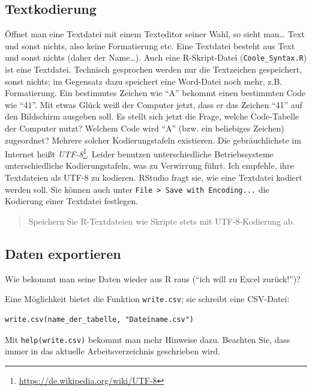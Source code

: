 \documentclass[12pt,ngerman,]{book}
\let\rmarkdownfootnote\footnote%
\def\footnote{\protect\rmarkdownfootnote}
\begin{document}
\subsection{Textkodierung}\label{textkodierung}

Öffnet man eine Textdatei mit einem Texteditor seiner Wahl, so sieht
man\ldots{} Text und sonst nichts, also keine Formatierung etc. Eine
Textdatei besteht aus Text und sonst nichts (daher der Name\ldots{}).
Auch eine R-Skript-Datei (\texttt{Coole\_Syntax.R}) ist eine Textdatei.
Technisch gesprochen werden nur die Textzeichen gespeichert, sonst
nichts; im Gegensatz dazu speichert eine Word-Datei noch mehr, z.B.
Formatierung. Ein bestimmtes Zeichen wie ``A'' bekommt einen bestimmten
Code wie ``41''. Mit etwas Glück weiß der Computer jetzt, dass er das
Zeichen ``41'' auf den Bildschirm ausgeben soll. Es stellt sich jetzt
die Frage, welche Code-Tabelle der Computer nutzt? Welchem Code wird
``A'' (bzw. ein beliebiges Zeichen) zugeordnet? Mehrere solcher
Kodierungstafeln existieren. Die gebräuchlichste im Internet heißt
\emph{UTF-8}\footnote{\url{https://de.wikipedia.org/wiki/UTF-8}}. Leider
benutzen unterschiedliche Betriebssysteme unterschiedliche
Kodierungstafeln, was zu Verwirrung führt. Ich empfehle, ihre
Textdateien als UTF-8 zu kodieren. RStudio fragt sie, wie eine Textdatei
kodiert werden soll. Sie können auch unter
\texttt{File\ \textgreater{}\ Save\ with\ Encoding...} die Kodierung
einer Textdatei festlegen.

\begin{quote}
Speichern Sie R-Textdateien wie Skripte stets mit UTF-8-Kodierung ab.
\end{quote}

\subsection{Daten exportieren}\label{daten-exportieren}

Wie bekommt man seine Daten wieder aus R raus (``ich will zu Excel
zurück!'')?

Eine Möglichkeit bietet die Funktion \texttt{write.csv}; sie schreibt
eine CSV-Datei:

\begin{verbatim}
write.csv(name_der_tabelle, "Dateiname.csv")
\end{verbatim}

Mit \texttt{help(write.csv)} bekommt man mehr Hinweise dazu. Beachten
Sie, dass immer in das aktuelle Arbeitsverzeichnis geschrieben wird.
\end{document}
